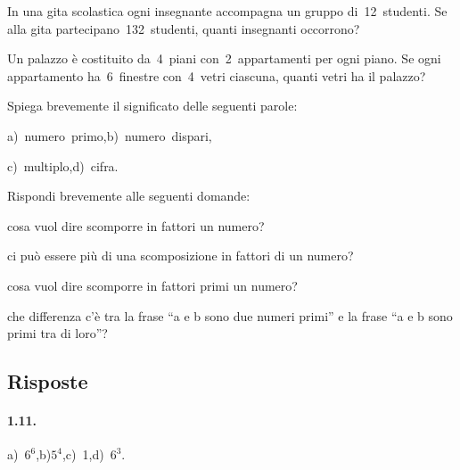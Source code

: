 \begin{multicols}{2}
\begin{esercizio}
In una gita scolastica ogni insegnante accompagna un gruppo di~12~studenti. Se alla gita partecipano~132~studenti,
quanti insegnanti occorrono?
\end{esercizio}

\begin{esercizio}
Un palazzo è costituito da~4~piani con~2~appartamenti per ogni piano. Se ogni appartamento ha~6~finestre con~4~vetri
ciascuna, quanti vetri ha il palazzo?
\end{esercizio}

\begin{esercizio}
Spiega brevemente il significato delle seguenti parole:

a)~numero~primo,\quad b)~numero~dispari,

c)~multiplo,\quad d)~cifra.
\end{esercizio}

\begin{esercizio}
Rispondi brevemente alle seguenti domande:
 \begin{enumeratea}
 \item cosa vuol dire scomporre in fattori un numero?
 \item ci può essere più di una scomposizione in fattori di un numero?
 \item cosa vuol dire scomporre in fattori primi un numero?
 \item che differenza c'è tra la frase ``a e b sono due numeri primi'' e la frase ``a e b sono primi tra di loro''?
 \end{enumeratea}
\end{esercizio}
\end{multicols}
\subsection{Risposte}

\paragraph{1.11.}
a)~$6^6$,\quad b)$5^4$,\quad c)~1,\quad d)~$6^3$.

